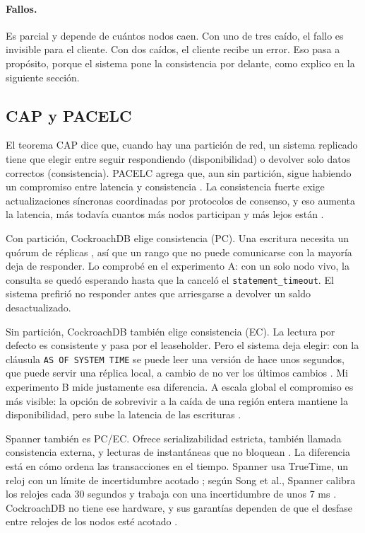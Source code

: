 \documentclass[12pt,a4paper]{article}
\begin{document}
\paragraph{Fallos.} Es parcial y depende de cuántos nodos caen. Con uno de tres caído, el fallo es invisible para el cliente. Con dos caídos, el cliente recibe un error. Eso pasa a propósito, porque el sistema pone la consistencia por delante, como explico en la siguiente sección.

\subsection{CAP y PACELC}

El teorema CAP dice que, cuando hay una partición de red, un sistema replicado tiene que elegir entre seguir respondiendo (disponibilidad) o devolver solo datos correctos (consistencia). PACELC agrega que, aun sin partición, sigue habiendo un compromiso entre latencia y consistencia \cite{ahmed2023consistency}. La consistencia fuerte exige actualizaciones síncronas coordinadas por protocolos de consenso, y eso aumenta la latencia, más todavía cuantos más nodos participan y más lejos están \cite{ahmed2023consistency}.

Con partición, CockroachDB elige consistencia (PC). Una escritura necesita un quórum de réplicas \cite{ajmani2022demo}, así que un rango que no puede comunicarse con la mayoría deja de responder. Lo comprobé en el experimento A: con un solo nodo vivo, la consulta se quedó esperando hasta que la canceló el \texttt{statement\_timeout}. El sistema prefirió no responder antes que arriesgarse a devolver un saldo desactualizado.

Sin partición, CockroachDB también elige consistencia (EC). La lectura por defecto es consistente y pasa por el leaseholder. Pero el sistema deja elegir: con la cláusula \texttt{AS OF SYSTEM TIME} se puede leer una versión de hace unos segundos, que puede servir una réplica local, a cambio de no ver los últimos cambios \cite{ajmani2022demo}. Mi experimento B mide justamente esa diferencia. A escala global el compromiso es más visible: la opción de sobrevivir a la caída de una región entera mantiene la disponibilidad, pero sube la latencia de las escrituras \cite{ajmani2022demo}.

Spanner también es PC/EC. Ofrece serializabilidad estricta, también llamada consistencia externa, y lecturas de instantáneas que no bloquean \cite{song2025k2}. La diferencia está en cómo ordena las transacciones en el tiempo. Spanner usa TrueTime, un reloj con un límite de incertidumbre acotado \cite{song2025k2}; según Song et al., Spanner calibra los relojes cada 30 segundos y trabaja con una incertidumbre de unos 7 ms \cite{song2025k2}. CockroachDB no tiene ese hardware, y sus garantías dependen de que el desfase entre relojes de los nodos esté acotado \cite{ajmani2022demo}.
\end{document}
